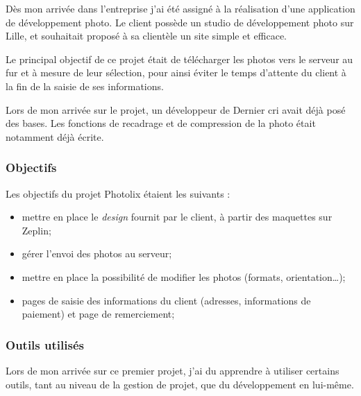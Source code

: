 \documentclass[12pt,a4paper]{article}
\providecommand{\tightlist}{%
  \setlength{\itemsep}{0pt}\setlength{\parskip}{0pt}}
\begin{document}
  \bigskip

  Dès mon arrivée dans l'entreprise j'ai été assigné à la réalisation
  d'une application de développement photo. Le client possède un studio de
  développement photo sur Lille, et souhaitait proposé à sa clientèle un
  site simple et efficace.

  \bigskip

  Le principal objectif de ce projet était de télécharger les photos vers
  le serveur au fur et à mesure de leur sélection, pour ainsi éviter le
  temps d'attente du client à la fin de la saisie de ses informations.

  \bigskip

  Lors de mon arrivée sur le projet, un développeur de Dernier cri avait
  déjà posé des bases. Les fonctions de recadrage et de compression de la
  photo était notamment déjà écrite.

  \bigskip

  \subsubsection{Objectifs}\label{objectifs}

  \bigskip

  Les objectifs du projet Photolix étaient les suivants :

  \begin{itemize}
  \tightlist
  \item
    mettre en place le \emph{design} fournit par le client, à partir des
    maquettes sur Zeplin;
  \item
    gérer l'envoi des photos au serveur;
  \item
    mettre en place la possibilité de modifier les photos (formats,
    orientation\ldots{});
  \item
    pages de saisie des informations du client (adresses, informations de
    paiement) et page de remerciement;
  \end{itemize}

  \bigskip

  \subsubsection{Outils utilisés}\label{outils-utilisuxe9s}

  \bigskip

  Lors de mon arrivée sur ce premier projet, j'ai du apprendre à utiliser
  certains outils, tant au niveau de la gestion de projet, que du
  développement en lui-même.
\end{document}
